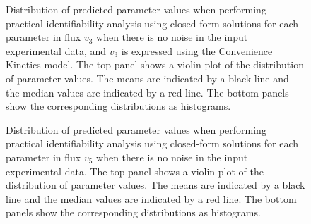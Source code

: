 \documentclass[10pt]{article}
\begin{document}
\begin{figure}[!tbhp]
	\caption{Distribution of predicted parameter values when performing practical identifiability analysis using closed-form solutions for each parameter in flux $v_3$ when there is no noise in the input experimental data, and $v_3$ is expressed using the Convenience Kinetics model. The top panel shows a violin plot of the distribution of parameter values. The means are indicated by a black line and the median values are indicated by a red line. The bottom panels show the corresponding distributions as histograms.}\label{fig:v3_ck_values}
\end{figure}

\begin{figure}[!tbhp]
	\caption{Distribution of predicted parameter values when performing practical identifiability analysis using closed-form solutions for each parameter in flux $v_5$ when there is no noise in the input experimental data. The top panel shows a violin plot of the distribution of parameter values. The means are indicated by a black line and the median values are indicated by a red line. The bottom panels show the corresponding distributions as histograms.}\label{fig:v5_ck_values}
\end{figure}
\end{document}
